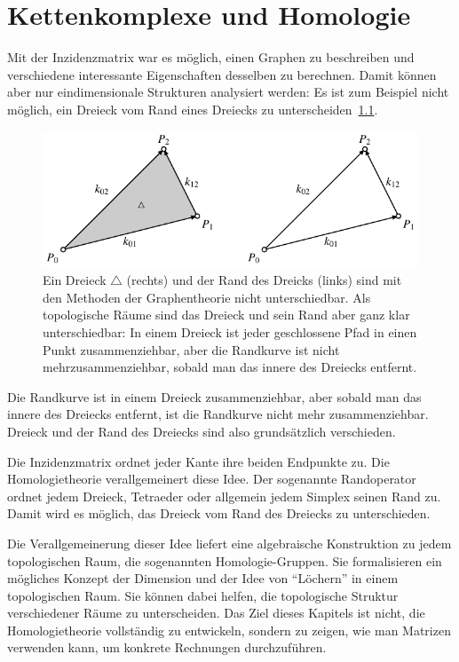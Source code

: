 %
%
%
\chapter{Kettenkomplexe und Homologie
\label{buch:chapter:homologie}}
\rhead{}
Mit der Inzidenzmatrix war es möglich, einen Graphen zu beschreiben
und verschiedene interessante Eigenschaften desselben zu berechnen.
Damit können aber nur eindimensionale Strukturen analysiert werden:
Es ist zum Beispiel nicht möglich, ein Dreieck vom Rand eines
Dreiecks zu unterscheiden~\ref{buch:homologie:figure:zusammenziehbar}.
\begin{figure}
\centering
\includegraphics{chapters/95-homologie/images/dreieck.pdf}
\caption{Ein Dreieck $\triangle$ (rechts) und der Rand des Dreicks
(links) sind mit den Methoden
der Graphentheorie nicht unterschiedbar. 
Als topologische Räume sind das Dreieck und sein Rand aber ganz klar
unterschiedbar: In einem Dreieck ist jeder geschlossene Pfad in einen 
Punkt zusammenziehbar, aber die Randkurve ist nicht mehrzusammenziehbar,
sobald man das innere des Dreiecks entfernt.
\label{buch:homologie:figure:zusammenziehbar}}
\end{figure}
Die Randkurve ist in einem Dreieck zusammenziehbar, aber sobald man
das innere des Dreiecks entfernt, ist die Randkurve nicht mehr
zusammenziehbar.
Dreieck und der Rand des Dreiecks sind also grundsätzlich verschieden.

Die Inzidenzmatrix ordnet jeder Kante ihre beiden Endpunkte zu.
Die Homologietheorie verallgemeinert diese Idee.
Der sogenannte Randoperator ordnet jedem Dreieck, Tetraeder oder allgemein
jedem Simplex seinen Rand zu.
Damit wird es möglich, das Dreieck vom Rand des Dreiecks zu unterschieden.

Die Verallgemeinerung dieser Idee liefert eine algebraische Konstruktion
zu jedem topologischen Raum, die sogenannten Homologie-Gruppen.
Sie formalisieren ein mögliches Konzept der Dimension und der
Idee von ``Löchern'' in einem topologischen Raum.
Sie können dabei helfen, die topologische Struktur verschiedener
Räume zu unterscheiden.
Das Ziel dieses Kapitels ist nicht, die Homologietheorie 
vollständig zu entwickeln, sondern zu zeigen, wie man Matrizen
verwenden kann, um konkrete Rechnungen durchzuführen.




%








